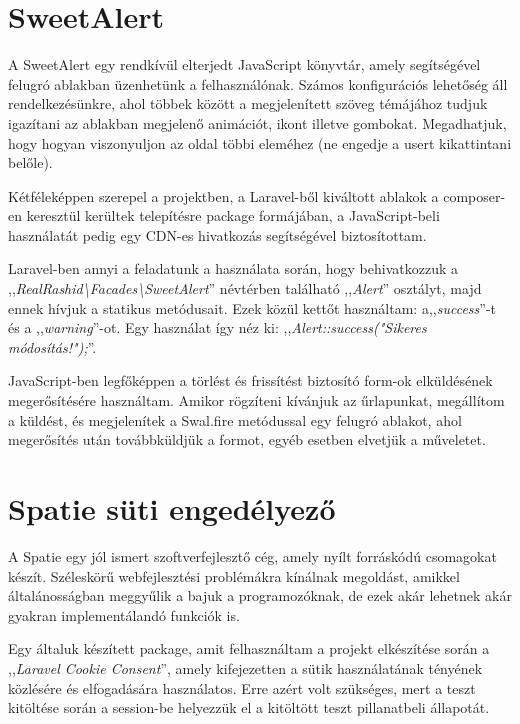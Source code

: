 \documentclass[
]{thesis-ekf}
\theoremstyle{definition}
\theoremstyle{remark}
\begin{document}
            \section{SweetAlert}
            	A SweetAlert egy rendkívül elterjedt JavaScript könyvtár, amely segítségével felugró ablakban üzenhetünk a felhasználónak. Számos konfigurációs lehetőség áll rendelkezésünkre, ahol többek között a megjelenített szöveg témájához tudjuk igazítani az ablakban megjelenő animációt, ikont illetve gombokat. Megadhatjuk, hogy hogyan viszonyuljon az oldal többi eleméhez (ne engedje a usert kikattintani belőle). 
            	
            	Kétféleképpen szerepel a projektben, a Laravel-ből\cite{SweetAlert-Laravel} kiváltott ablakok a composer-en keresztül kerültek telepítésre package formájában, a JavaScript-beli használatát pedig egy CDN-es\cite{SweetAlert-js} hivatkozás segítségével biztosítottam.
            	
            	Laravel-ben annyi a feladatunk a használata során, hogy behivatkozzuk a ,,\emph{RealRashid\textbackslash Facades\textbackslash SweetAlert}'' névtérben található ,,\emph{Alert}'' osztályt, majd ennek hívjuk a statikus metódusait. Ezek közül kettőt használtam: a,,\emph{success}''-t és a ,,\emph{warning}''-ot. Egy használat így néz ki: ,,\emph{Alert::success("Sikeres módosítás!");}''. 
            	
            	JavaScript-ben legfőképpen a törlést és frissítést biztosító form-ok elküldésének megerősítésére használtam. Amikor rögzíteni kívánjuk az űrlapunkat, megállítom a küldést, és megjelenítek a Swal.fire metódussal egy felugró ablakot, ahol megerősítés után továbbküldjük a formot, egyéb esetben elvetjük a műveletet.
            \section{Spatie süti engedélyező}
            	A Spatie egy jól ismert szoftverfejlesztő cég, amely nyílt forráskódú csomagokat készít. Széleskörű webfejlesztési problémákra kínálnak megoldást, amikkel általánosságban meggyűlik a bajuk a programozóknak, de ezek akár lehetnek akár gyakran implementálandó funkciók is. 
            	
            	Egy általuk készített package, amit felhasználtam a projekt elkészítése során a ,,\emph{Laravel Cookie Consent}''\cite{Spatie-CookieConsent}, amely kifejezetten a sütik használatának tényének közlésére és elfogadására használatos. Erre azért volt szükséges, mert a teszt kitöltése során a session-be helyezzük el a kitöltött teszt pillanatbeli állapotát. 
            	
\end{document}
